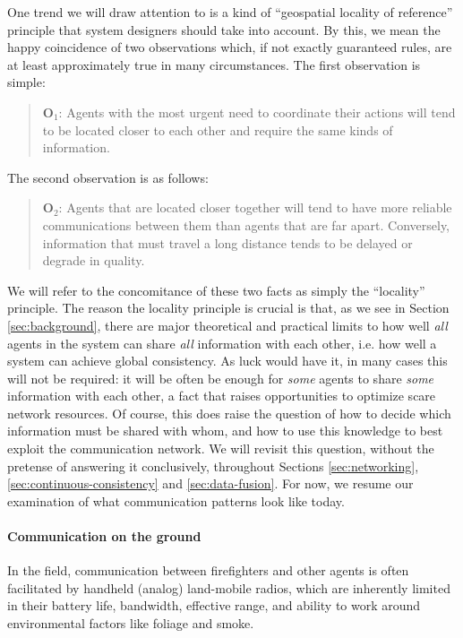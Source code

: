 \documentclass[]             %
{NASA}                       %
\theoremstyle{definition}
\begin{document}
One trend we will draw attention to is a kind of ``geospatial locality
of reference'' principle that system designers should take into
account. By this, we mean the happy coincidence of two observations
which, if not exactly guaranteed rules, are at least approximately
true in many circumstances. The first observation is simple:
\begin{quote}
  $\textbf{O}_1$: Agents with the most urgent need to
  coordinate their actions will tend to be located closer to each
  other and require the same kinds of information.
\end{quote}
The second observation is as follows:
\begin{quote}
  $\textbf{O}_2$: Agents that are located closer together
  will tend to have more reliable communications between them than
  agents that are far apart. Conversely, information that must travel
  a long distance tends to be delayed or degrade in quality.
\end{quote}

We will refer to the concomitance of these two facts as simply the
``locality'' principle. The reason the locality principle is crucial
is that, as we see in Section \ref{sec:background}, there are major
theoretical and practical limits to how well \emph{all} agents in the
system can share \emph{all} information with each other, i.e. how well
a system can achieve global consistency. As luck would have it, in
many cases this will not be required: it will be often be enough for
\emph{some} agents to share \emph{some} information with each other, a
fact that raises opportunities to optimize scare network resources. Of
course, this does raise the question of how to decide which
information must be shared with whom, and how to use this knowledge to
best exploit the communication network. We will revisit this question,
without the pretense of answering it conclusively, throughout Sections
\ref{sec:networking}, \ref{sec:continuous-consistency} and
\ref{sec:data-fusion}. For now, we resume our examination of what
communication patterns look like today.

\paragraph{Communication on the ground}
In the field, communication between firefighters and other agents is
often facilitated by handheld (analog) land-mobile radios, which are
inherently limited in their battery life, bandwidth, effective range,
and ability to work around environmental factors like foliage and
smoke.
\end{document}
